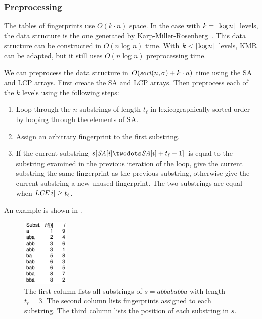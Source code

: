 \documentclass[a4]{article}
\newcommand*{\pref}{\prettyref}
\begin{document}
\subsubsection{Preprocessing}

The tables of fingerprints use $O(k\cdot n)$ space. In the case with $k=\lceil\log n\rceil$ levels, the data structure is the one generated by Karp-Miller-Rosenberg~\cite{karp-miller-rosenberg}. This data structure can be constructed in $O(n\log n)$ time. With $k<\lceil\log n\rceil$ levels, KMR can be adapted, but it still uses $O(n\log n)$ preprocessing time.

We can preprocess the data structure in $O(\textit{sort}(n,\sigma) + k\cdot n)$ time using the SA and LCP arrays. First create the SA and LCP arrays. Then preprocess each of the $k$ levels using the following steps:
\begin{samepage}
\begin{enumerate}
\item Loop through the $n$ substrings of length $t_\ell$ in lexicographically sorted order by looping through the elements of SA.
\item Assign an arbitrary fingerprint to the first substring.
\item If the current substring $s[\SA[i]\twodots\SA[i]+t_\ell-1]$ is equal to the substring examined in the previous iteration of the loop, give the current substring the same fingerprint as the previous substring, otherwise give the current substring a new unused fingerprint. The two substrings are equal when $\textit{LCE}[i] \geq t_\ell$.
\end{enumerate}

An example is shown in \pref{fig:fingerprint-preproc}.
\end{samepage}

\begin{figure}[tp]
    \begin{center}
        \includegraphics[width=0.2\textwidth,page=1]{fingerprint-preproc.pdf}
    \end{center}
    \caption{\label{fig:fingerprint-preproc}The first column lists all substrings of $s=abbababba$ with length $t_\ell = 3$. The second column lists fingerprints assigned to each substring. The third column lists the position of each substring in $s$.}
\end{figure}
\end{document}
